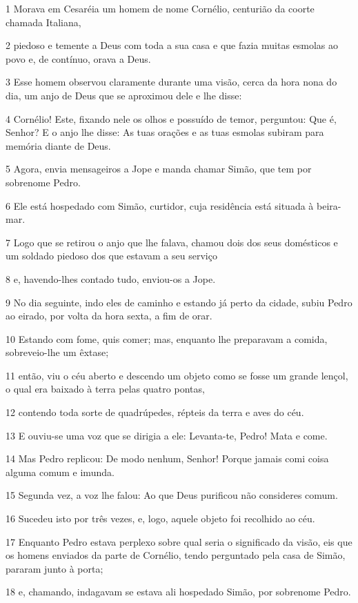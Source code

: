 \par 1 Morava em Cesaréia um homem de nome Cornélio, centurião da coorte chamada Italiana,
\par 2 piedoso e temente a Deus com toda a sua casa e que fazia muitas esmolas ao povo e, de contínuo, orava a Deus.
\par 3 Esse homem observou claramente durante uma visão, cerca da hora nona do dia, um anjo de Deus que se aproximou dele e lhe disse:
\par 4 Cornélio! Este, fixando nele os olhos e possuído de temor, perguntou: Que é, Senhor? E o anjo lhe disse: As tuas orações e as tuas esmolas subiram para memória diante de Deus.
\par 5 Agora, envia mensageiros a Jope e manda chamar Simão, que tem por sobrenome Pedro.
\par 6 Ele está hospedado com Simão, curtidor, cuja residência está situada à beira-mar.
\par 7 Logo que se retirou o anjo que lhe falava, chamou dois dos seus domésticos e um soldado piedoso dos que estavam a seu serviço
\par 8 e, havendo-lhes contado tudo, enviou-os a Jope.
\par 9 No dia seguinte, indo eles de caminho e estando já perto da cidade, subiu Pedro ao eirado, por volta da hora sexta, a fim de orar.
\par 10 Estando com fome, quis comer; mas, enquanto lhe preparavam a comida, sobreveio-lhe um êxtase;
\par 11 então, viu o céu aberto e descendo um objeto como se fosse um grande lençol, o qual era baixado à terra pelas quatro pontas,
\par 12 contendo toda sorte de quadrúpedes, répteis da terra e aves do céu.
\par 13 E ouviu-se uma voz que se dirigia a ele: Levanta-te, Pedro! Mata e come.
\par 14 Mas Pedro replicou: De modo nenhum, Senhor! Porque jamais comi coisa alguma comum e imunda.
\par 15 Segunda vez, a voz lhe falou: Ao que Deus purificou não consideres comum.
\par 16 Sucedeu isto por três vezes, e, logo, aquele objeto foi recolhido ao céu.
\par 17 Enquanto Pedro estava perplexo sobre qual seria o significado da visão, eis que os homens enviados da parte de Cornélio, tendo perguntado pela casa de Simão, pararam junto à porta;
\par 18 e, chamando, indagavam se estava ali hospedado Simão, por sobrenome Pedro.

